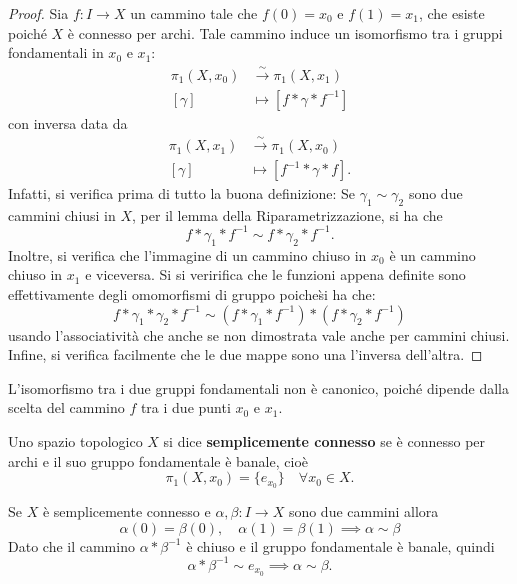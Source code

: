 \documentclass[]{article}
\begin{document}
    \begin{proof}
    Sia $f: I \to X$ un cammino tale che $f(0) = x_0$ e $f(1) = x_1$, che esiste poiché $X$ è connesso per archi.
    Tale cammino induce un isomorfismo tra i gruppi fondamentali in $x_0$ e $x_1$:
    \[
        \begin{aligned}
            \pi_1(X, x_0) &\xrightarrow{\sim} \pi_1(X, x_1) \\
            [\gamma] &\mapsto [f * \gamma * f^{-1}]
        \end{aligned}
    \]
    con inversa data da
    \[
        \begin{aligned}
            \pi_1(X, x_1) &\xrightarrow{\sim} \pi_1(X, x_0) \\
            [\gamma] &\mapsto [f^{-1} * \gamma * f].
        \end{aligned}
    \]
    Infatti, si verifica prima di tutto la buona definizione: \nl
    Se $\gamma_1 \sim \gamma_2$ sono due cammini chiusi in $X$, per il lemma della Riparametrizzazione, si ha che
    \[
        f * \gamma_1 * f^{-1} \sim f * \gamma_2 * f^{-1}.
    \]
    Inoltre, si verifica che l'immagine di un cammino chiuso in $x_0$ è un cammino chiuso in $x_1$ e viceversa. \nl
    Si si veririfica che le funzioni appena definite sono effettivamente degli omomorfismi di gruppo
    poiche\` si ha che: 
    \[
        f * \gamma_1 * \gamma_2 * f^{-1} \sim (f * \gamma_1 * f^{-1}) * (f * \gamma_2 * f^{-1})
    \]
    usando l'associatività che anche se non dimostrata vale anche per cammini chiusi. \nl
    Infine, si verifica facilmente che le due mappe sono una l'inversa dell'altra.
\end{proof}

\begin{remark} \nl
    L'isomorfismo tra i due gruppi fondamentali non è canonico, poiché dipende dalla scelta del cammino $f$ tra i due punti $x_0$ e $x_1$.
\end{remark}

\begin{definition}  \nl
    Uno spazio topologico $X$ si dice \textbf{semplicemente connesso} se è connesso per archi e il suo gruppo fondamentale è banale, cioè
    \[
        \pi_1(X, x_0) = \{ e_{x_0} \} \quad \forall x_0 \in X.
    \]
\end{definition}

\begin{remark} \nl
    Se $X$ è semplicemente connesso e $\alpha, \beta: I \to X$ sono due cammini allora
    \[ \alpha(0) = \beta(0), \quad \alpha(1) = \beta(1) \implies \alpha \sim \beta\]
    Dato che il cammino $\alpha * \beta^{-1}$ è chiuso e il gruppo fondamentale è banale, quindi
    \[
        \alpha * \beta^{-1} \sim e_{x_0} \implies \alpha \sim \beta.
    \]
\end{remark}
\end{document}
